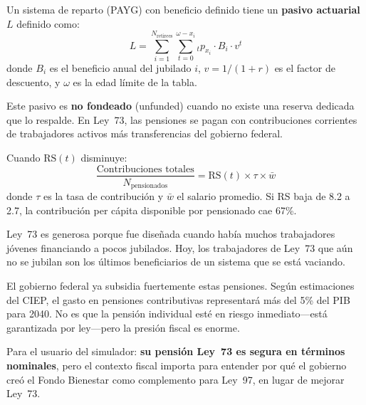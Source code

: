 \documentclass[11pt,a4paper]{report}
\begin{document}
\begin{tcolorbox}[colback=blue!5!white, colframe=blue!75!black, title=\textbf{Definici\'on Formal: Pasivo Contingente No Fondeado}]
Un sistema de reparto (PAYG) con beneficio definido tiene un \textbf{pasivo actuarial} $L$ definido como:
\[
  L = \sum_{i=1}^{N_{\text{retirees}}} \sum_{t=0}^{\omega - x_i} {}_tp_{x_i} \cdot B_i \cdot v^t
\]
donde $B_i$ es el beneficio anual del jubilado $i$, $v = 1/(1+r)$ es el factor de descuento, y $\omega$ es la edad l\'imite de la tabla.

Este pasivo es \textbf{no fondeado} (unfunded) cuando no existe una reserva dedicada que lo respalde. En Ley~73, las pensiones se pagan con contribuciones corrientes de trabajadores activos m\'as transferencias del gobierno federal.

Cuando $\text{RS}(t)$ disminuye:
\[
  \frac{\text{Contribuciones totales}}{N_{\text{pensionados}}} = \text{RS}(t) \times \tau \times \bar{w}
\]
donde $\tau$ es la tasa de contribuci\'on y $\bar{w}$ el salario promedio. Si RS baja de 8.2 a 2.7, la contribuci\'on per c\'apita disponible por pensionado cae 67\%.
\end{tcolorbox}

\begin{tcolorbox}[colback=green!5!white, colframe=green!50!black, title=\textbf{Intuici\'on: El Problema del ``\'Ultimo en Salir''}]
Ley~73 es generosa porque fue dise\~nada cuando hab\'ia muchos trabajadores j\'ovenes financiando a pocos jubilados. Hoy, los trabajadores de Ley~73 que a\'un no se jubilan son los \'ultimos beneficiarios de un sistema que se est\'a vaciando.

El gobierno federal ya subsidia fuertemente estas pensiones. Seg\'un estimaciones del CIEP, el gasto en pensiones contributivas representar\'a m\'as del 5\% del PIB para 2040. No es que la pensi\'on individual est\'e en riesgo inmediato---est\'a garantizada por ley---pero la presi\'on fiscal es enorme.

Para el usuario del simulador: \textbf{su pensi\'on Ley~73 es segura en t\'erminos nominales}, pero el contexto fiscal importa para entender por qu\'e el gobierno cre\'o el Fondo Bienestar como complemento para Ley~97, en lugar de mejorar Ley~73.
\end{tcolorbox}
\end{document}
